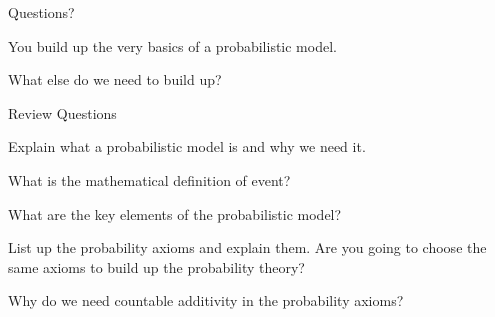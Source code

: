 \begin{frame}{}
\vspace{2cm}
\LARGE Questions?




\end{frame}

\begin{frame}{}
\vspace{2cm}


\medskip
\LARGE You build up the very basics of a probabilistic model. 

\medskip

\LARGE What else do we need to build up?
\end{frame}

\begin{frame}{Review Questions}
\bce[1)]
\item Explain what a probabilistic model is and why we need it. 

\item What is the mathematical definition of event?

\item What are the key elements of the probabilistic model?

\item List up the probability axioms and explain them. Are you going
  to choose the same axioms to build up the probability theory?

\item Why do we need countable additivity in the probability axioms?

\ece
\end{frame}





